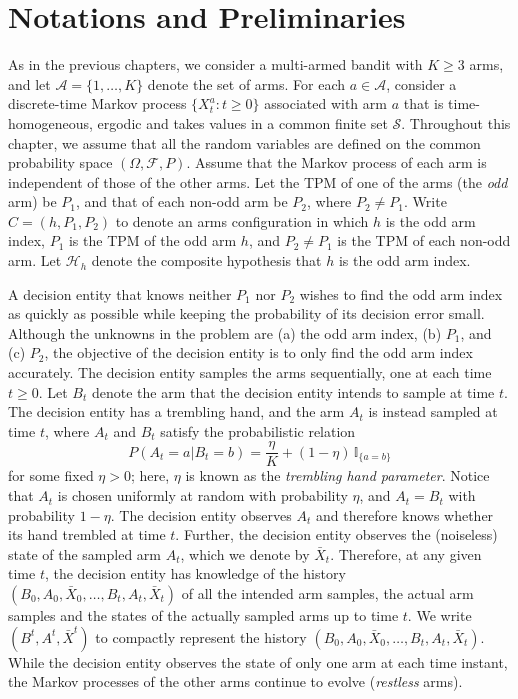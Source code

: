 \section{Notations and Preliminaries}\label{sec:notations}
As in the previous chapters, we consider a multi-armed bandit with $K\geq 3$ arms, and let $\mathcal{A}=\{1, \ldots, K\}$ denote the set of arms. For each $a\in \mathcal{A}$, consider a discrete-time Markov process $\{X_t^a:t\geq 0\}$ associated with arm $a$ that is time-homogeneous, ergodic and takes values in a common finite set $\mathcal{S}$. {\color{black} Throughout this chapter, we assume that all the random variables are defined on the common probability space $(\Omega, \mathcal{F}, P)$.} Assume that the Markov process of each arm is independent of those of the other arms. Let the TPM of one of the arms (the {\em odd} arm) be $P_1$, and that of each non-odd arm be $P_2$, where $P_2\neq P_1$. Write $C=(h, P_1, P_2)$ to denote an arms configuration in which $h$ is the odd arm index, $P_1$ is the TPM of the odd arm $h$, and $P_2\neq P_1$ is the TPM of each non-odd arm. Let $\mathcal{H}_h$ denote the composite hypothesis that $h$ is the odd arm index.
 
A decision entity that knows neither $P_1$ nor $P_2$ wishes to find the odd arm index as quickly as possible while keeping the probability of its decision error small. Although the unknowns in the problem are (a) the odd arm index, (b) $P_1$, and (c) $P_2$, the objective of the decision entity is to only find the odd arm index accurately. The decision entity samples the arms sequentially, one at each time $t\geq 0$. Let $B_t$ denote the arm that the decision entity intends to sample at time $t$. The decision entity has a trembling hand, and the arm $A_t$ is instead sampled at time $t$, where $A_t$ and $B_t$ satisfy the probabilistic relation
\begin{equation}
P(A_t=a|B_t=b)=\frac{\eta}{K} + (1-\eta)\,\mathbb{I}_{\{a=b\}}
\label{eq:trembling_hand_relation}
\end{equation}
for some fixed $\eta>0$; here, $\eta$ is known as the {\em trembling hand parameter}. Notice that $A_t$ is chosen uniformly at random with probability $\eta$, and $A_t=B_t$ with probability $1-\eta$. The decision entity observes $A_t$ and therefore knows whether its hand trembled at time $t$. Further, the decision entity observes the (noiseless) state of the sampled arm $A_t$, which we denote by $\bar{X}_t$. Therefore, at any given time $t$, the decision entity has knowledge of the history $(B_0, A_0, \bar{X}_0, \ldots, B_t, A_t, \bar{X}_t)$ of all the intended arm samples, the actual arm samples and the states of the actually sampled arms up to time $t$. We write $(B^t, A^t,\bar{X}^t)$ to compactly represent the history $(B_0, A_0, \bar{X}_0, \ldots, B_t, A_t, \bar{X}_t)$. While the decision entity observes the state of only one arm at each time instant, the Markov processes of the other arms continue to evolve ({\em restless} arms). 

